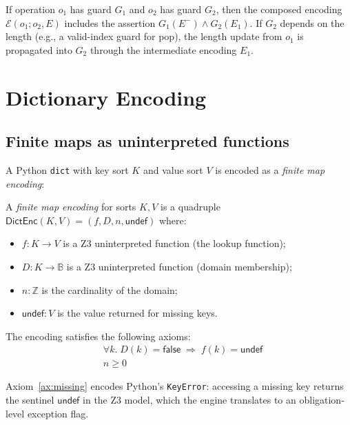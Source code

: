 \documentclass[11pt]{article}
\newcommand{\prestate}[1]{#1^{-}}
\newcommand{\DictEnc}[1]{\mathsf{DictEnc}(#1)}
\begin{document}
\begin{proposition}\label{prop:guardpres}
If operation $o_1$ has guard $G_1$ and $o_2$ has guard $G_2$, then the
composed encoding $\mathcal{E}(o_1; o_2, E)$ includes the assertion
$G_1(\prestate{E}) \wedge G_2(E_1)$.  If $G_2$ depends on the length
(e.g., a valid-index guard for pop), the length update from $o_1$ is
propagated into $G_2$ through the intermediate encoding $E_1$.
\end{proposition}

\section{Dictionary Encoding}\label{sec:dictenc}

\subsection{Finite maps as uninterpreted functions}

A Python \texttt{dict} with key sort $K$ and value sort $V$ is encoded as a
\emph{finite map encoding}:

\begin{definition}\label{def:fme}
A \emph{finite map encoding} for sorts $K, V$ is a quadruple
$\DictEnc{K,V} = (f, D, n, \mathsf{undef})$
where:
\begin{itemize}[nosep]
  \item $f : K \to V$ is a Z3 uninterpreted function (the lookup function);
  \item $D : K \to \mathbb{B}$ is a Z3 uninterpreted function (domain membership);
  \item $n : \mathbb{Z}$ is the cardinality of the domain;
  \item $\mathsf{undef} : V$ is the value returned for missing keys.
\end{itemize}
The encoding satisfies the following axioms:
\begin{align}
  &\forall k.\; D(k) = \mathsf{false} \;\Rightarrow\; f(k) = \mathsf{undef}
    \tag{Dict-Missing}\label{ax:missing}\\
  &n \geq 0 \tag{Dict-Card}\label{ax:card}
\end{align}
\end{definition}

Axiom~\eqref{ax:missing} encodes Python's \texttt{KeyError}: accessing a
missing key returns the sentinel $\mathsf{undef}$ in the Z3 model, which the
engine translates to an obligation-level exception flag.
\end{document}
